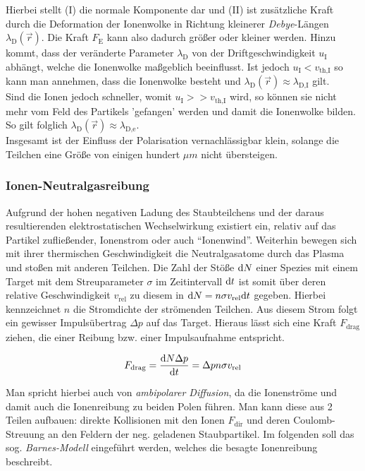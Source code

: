 \documentclass[numbers=noenddot,a4paper]{scrartcl}
\newcommand{\diff}{\textnormal{d}}
\newcommand{\ix}[1]{_\text{#1}}
\newcommand{\tilt}[1]{\textit{#1}}
\begin{document}
				Hierbei stellt (I) die normale Komponente dar und (II) ist zusätzliche Kraft durch die Deformation der Ionenwolke in Richtung kleinerer \tilt{Debye}-Längen $\lambda\ix{D}\left(\vec{r}\right)$. Die Kraft $F\ix{E}$ kann also dadurch größer oder kleiner werden. Hinzu kommt, dass der veränderte Parameter $\lambda\ix{D}$ von der Driftgeschwindigkeit $u\ix{I}$ abhängt, welche die Ionenwolke maßgeblich beeinflusst. Ist jedoch $u\ix{I}<v\ix{th,I}$ so kann man annehmen, dass die Ionenwolke besteht und $\lambda\ix{D}\left(\vec{r}\right)\approx\lambda\ix{D,I}$ gilt.\\
				Sind die Ionen jedoch schneller, womit $u\ix{I}>>v\ix{th,I}$ wird, so können sie nicht mehr vom Feld des Partikels 'gefangen' werden und damit die Ionenwolke bilden. So gilt folglich $\lambda\ix{D}\left(\vec{r}\right)\approx\lambda\ix{D,e}$.\\
				Insgesamt ist der Einfluss der Polarisation vernachlässigbar klein, solange die Teilchen eine Größe von einigen hundert $\unit{\mu m}$ nicht übersteigen.

			\subsubsection{Ionen-Neutralgasreibung}\label{subsub:reibung}

				Aufgrund der hohen negativen Ladung des Staubteilchens und der daraus resultierenden elektrostatischen Wechselwirkung existiert ein, relativ auf das Partikel zufließender, Ionenstrom oder auch "`Ionenwind"'. Weiterhin bewegen sich mit ihrer thermischen Geschwindigkeit die Neutralgasatome durch das Plasma und stoßen mit anderen Teilchen. Die Zahl der Stöße $\diff N$ einer Spezies mit einem Target mit dem Streuparameter $\sigma$ im Zeitintervall $\diff t$ ist somit über deren relative Geschwindigkeit $v\ix{rel}$ zu diesem in $\diff N=n\sigma v\ix{rel}\diff t$ gegeben. Hierbei kennzeichnet $n$ die Stromdichte der strömenden Teilchen. Aus diesem Strom folgt ein gewisser Impulsübertrag $\Delta p$ auf das Target. Hieraus lässt sich eine Kraft $F\ix{drag}$ ziehen, die einer Reibung bzw. einer Impulsaufnahme entspricht.
				
					\begin{align}
						F\ix{drag}=\frac{\diff N \Delta p}{\diff t}=\Delta p n \sigma v\ix{rel}
					\end{align}
					
				Man spricht hierbei auch von \tilt{ambipolarer Diffusion}, da die Ionenströme und damit auch die Ionenreibung zu beiden Polen führen. Man kann diese aus 2 Teilen aufbauen: direkte Kollisionen mit den Ionen $F\ix{dir}$ und deren Coulomb-Streuung an den Feldern der neg. geladenen Staubpartikel. Im folgenden soll das sog. \tilt{Barnes-Modell} eingeführt werden, welches die besagte Ionenreibung beschreibt.
				
\end{document}
